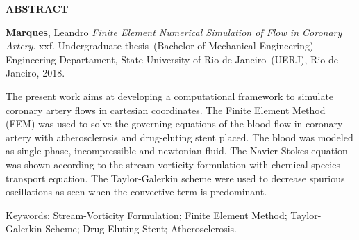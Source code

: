 \begin{center}
\textbf{ABSTRACT}
\end{center}


$\!$\\

\hspace{-1.3cm}\textbf{Marques}, Leandro \textit{Finite Element Numerical Simulation of Flow in Coronary Artery}. xxf.  Undergraduate thesis~(Bachelor of Mechanical Engineering) - Engineering Departament, State University of Rio de Janeiro~(UERJ), Rio de Janeiro, 2018.

\vspace{.2cm}

\indent The present work aims at developing a computational framework to simulate coronary artery flows in cartesian
coordinates. The Finite Element Method (FEM) was used to solve the governing equations of the blood flow in coronary
artery with atherosclerosis and drug-eluting stent placed. The blood was modeled as single-phase, incompressible and newtonian fluid. The Navier-Stokes equation was shown according to the stream-vorticity formulation with chemical species transport equation. The Taylor-Galerkin scheme were used to decrease spurious oscillations as seen when the convective term is predominant.

\vspace{1cm}

\hspace{-1.3cm}Keywords: Stream-Vorticity Formulation; Finite Element Method; Taylor-Galerkin Scheme; Drug-Eluting Stent; Atherosclerosis.
